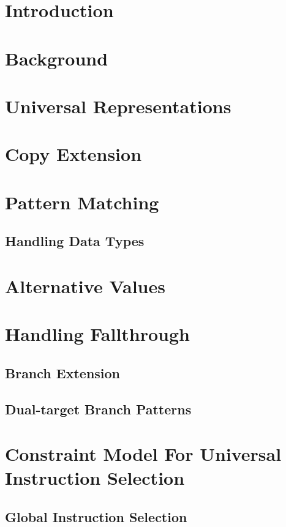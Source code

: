 \documentclass{book}
\begin{document}
\chapter{Introduction}

\chapter{Background}

\chapter{Universal Representations}

\chapter{Copy Extension}

\chapter{Pattern Matching}

\section{Handling Data Types}

\chapter{Alternative Values}

\chapter{Handling Fallthrough}

\section{Branch Extension}
\section{Dual-target Branch Patterns}

\chapter{Constraint Model For Universal Instruction Selection}

\section{Global Instruction Selection}
\end{document}
